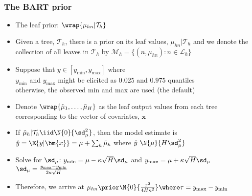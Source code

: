 \documentclass[11pt,dvipsnames,usenames,times]{beamer}
\begin{document}
\begin{comment}
\begin{frame}[fragile]
\frametitle{The BART prior\\
The distribution of $\theta/P$ and the sparse Dirichlet prior}
\begin{center}
\texttt{[image: sparse-beta-prime.pdf]}
\end{center}
\end{frame}
\end{comment}

\begin{frame}[fragile]
\frametitle{The BART prior}
\begin{itemize}
\item 
The leaf prior: $\wrap{\mu_{hn}|\mathcal{T}_h}$
\item Given a tree, $\mathcal{T}_h$, there is
a prior on its leaf values, $\mu_{hn}|\mathcal{T}_h$ and we denote the
collection of all leaves in $\mathcal{T}_h$ by
$\mathcal{M}_h=\{(n, \mu_{hn}): n \in \mathcal{L}_h \}$
\item
Suppose that $y \in [y_{\min}, y_{\max}]$ where\\ 
$y_{\min}$ and $y_{\max}$ might be elicited as $0.025$ and $0.975$ quantiles\\
otherwise, the observed min and max are used (the default)
\item Denote 
$\wrap{\tilde{\mu}_{1}, \dots, \tilde{\mu}_{H}}$ as the leaf output values from each 
tree corresponding to the vector of covariates, $\bm{x}$ %
\item 
If $\tilde{\mu}_{h}|\mathcal{T}_h \iid \N{0}{\sd_{\mu}^2}$, then the model 
estimate is 
$\hat{y}=\E{y|\bm{x}}=\mu+\sum_h\tilde{\mu}_{h}$ where
$\hat{y} ~ \N{\mu}{H \sd_{\mu}^2}$
\item Solve for $\sd_{\mu}$: %
$y_{\min}=\mu-\kappa\sqrt{H}\sd_{\mu}$
and $y_{\max}=\mu+\kappa\sqrt{H}\sd_{\mu}$\\
$\sd_{\mu}=\frac{y_{\max}-y_{\min}}{2 \kappa \sqrt{H}}$
\item Therefore, we arrive at
$\mu_{hn} \prior \N{0}{{\frac{\tau^2}{4H\kappa^2}}} \where
\tau={y_{\max}-y_{\min}}$
\end{itemize}
\end{frame}
\end{document}
